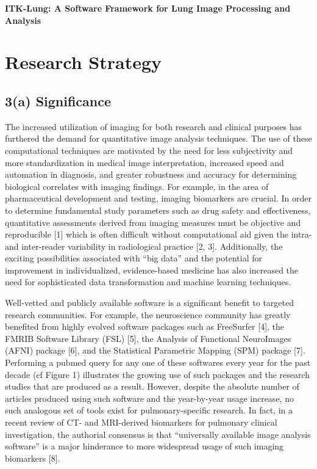 \documentclass[11pt,]{article}
\begin{document}
\newpage

\begin{center}
{\LARGE \bf ITK-Lung:  A Software Framework for Lung Image Processing and Analysis}
\end{center}

\section{Research Strategy}\label{research-strategy}

\subsection{\textbf{3(a) Significance}}\label{a-significance}

The increased utilization of imaging for both research and clinical
purposes has furthered the demand for quantitative image analysis
techniques. The use of these computational techniques are motivated by
the need for less subjectivity and more standardization in medical image
interpretation, increased speed and automation in diagnosis, and greater
robustness and accuracy for determining biological correlates with
imaging findings. For example, in the area of pharmaceutical development
and testing, imaging biomarkers are crucial. In order to determine
fundamental study parameters such as drug safety and effectiveness,
quantitative assessments derived from imaging measures must be objective
and reproducible {[}1{]} which is often difficult without computational
aid given the intra- and inter-reader variability in radiological
practice {[}2, 3{]}. Additionally, the exciting possibilities associated
with ``big data'' and the potential for improvement in individualized,
evidence-based medicine has also increased the need for sophisticated
data transformation and machine learning techniques.

Well-vetted and publicly available software is a significant benefit to
targeted research communities. For example, the neuroscience community
has greatly benefited from highly evolved software packages such as
FreeSurfer {[}4{]}, the FMRIB Software Library (FSL) {[}5{]}, the
Analysis of Functional NeuroImages (AFNI) package {[}6{]}, and the
Statistical Parametric Mapping (SPM) package {[}7{]}. Performing a
pubmed query for any one of these softwares every year for the past
decade (cf Figure 1) illustrates the growing use of such packages and
the research studies that are produced as a result. However, despite the
absolute number of articles produced using such software and the
year-by-year usage increase, no such analogous set of tools exist for
pulmonary-specific research. In fact, in a recent review of CT- and
MRI-derived biomarkers for pulmonary clinical investigation, the
authorial consensus is that ``universally available image analysis
software'' is a major hinderance to more widespread usage of such
imaging biomarkers {[}8{]}.
\end{document}
